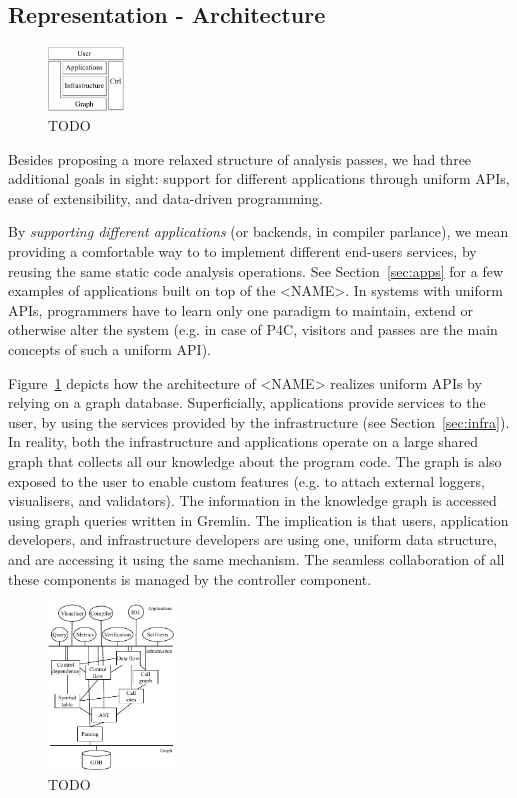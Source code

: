 \documentclass[sigconf]{acmart}
\begin{document}
\subsection{Representation - Architecture}\label{sec:rep} %


  \begin{figure}
    \includegraphics[width=0.18\textwidth]{figures/arch-top.pdf}
    \caption{TODO}\label{fig:arch-top}
  \end{figure}

Besides proposing a more relaxed structure of analysis passes, we had three additional goals in sight: support for different applications through uniform APIs, ease of extensibility, and data-driven programming.

By \textit{supporting different applications} (or backends, in compiler parlance), we mean providing a comfortable way to to implement different end-users services, by reusing the same static code analysis operations.
See Section~\ref{sec:apps} for a few examples of applications built on top of the <NAME>.
In systems with uniform APIs, programmers have to learn only one paradigm to maintain, extend or otherwise alter the system (e.g. in case of P4C, visitors and passes are the main concepts of such a uniform API). 

Figure~\ref{fig:arch-top} depicts how the architecture of <NAME> realizes uniform APIs by relying on a graph database. 
Superficially, applications provide services to the user, by using the services provided by the infrastructure (see Section~\ref{sec:infra}). In reality, both the infrastructure and applications operate on a large shared graph that collects all our knowledge about the program code. The graph is also exposed to the user to enable custom features (e.g. to attach external loggers, visualisers, and validators). The information in the knowledge graph is accessed using graph queries written in Gremlin. The implication is that users, application developers, and infrastructure developers are using one, uniform data structure, and are accessing it using the same mechanism. The seamless collaboration of all these components is managed by the controller component.

  \begin{figure}
    \includegraphics[width=0.3\textwidth]{figures/arch-deps.pdf}
    \caption{TODO}\label{fig:arch-deps}
  \end{figure}
\end{document}

